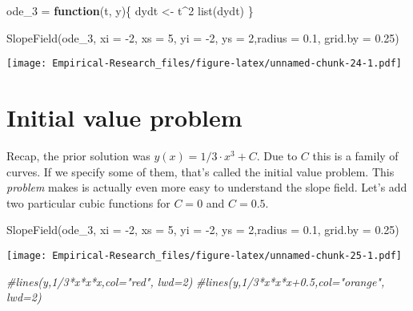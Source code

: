 \documentclass[
]{book}
\newenvironment{Shaded}{\begin{snugshade}}{\end{snugshade}}
\newcommand{\AttributeTok}[1]{\textcolor[rgb]{0.77,0.63,0.00}{#1}}
\newcommand{\CommentTok}[1]{\textcolor[rgb]{0.56,0.35,0.01}{\textit{#1}}}
\newcommand{\ControlFlowTok}[1]{\textcolor[rgb]{0.13,0.29,0.53}{\textbf{#1}}}
\newcommand{\DecValTok}[1]{\textcolor[rgb]{0.00,0.00,0.81}{#1}}
\newcommand{\FloatTok}[1]{\textcolor[rgb]{0.00,0.00,0.81}{#1}}
\newcommand{\FunctionTok}[1]{\textcolor[rgb]{0.00,0.00,0.00}{#1}}
\newcommand{\NormalTok}[1]{#1}
\newcommand{\OtherTok}[1]{\textcolor[rgb]{0.56,0.35,0.01}{#1}}
\newcommand{\SpecialCharTok}[1]{\textcolor[rgb]{0.00,0.00,0.00}{#1}}
\begin{document}
\begin{Shaded}
\begin{Highlighting}[]
\NormalTok{ode\_3 }\OtherTok{=} \ControlFlowTok{function}\NormalTok{(t, y)\{}
\NormalTok{  dydt }\OtherTok{\textless{}{-}}\NormalTok{ t}\SpecialCharTok{\^{}}\DecValTok{2}
  \FunctionTok{list}\NormalTok{(dydt)}
\NormalTok{\}}

\FunctionTok{SlopeField}\NormalTok{(ode\_3, }\AttributeTok{xi =} \SpecialCharTok{{-}}\DecValTok{2}\NormalTok{, }\AttributeTok{xs =} \DecValTok{5}\NormalTok{, }\AttributeTok{yi =} \SpecialCharTok{{-}}\DecValTok{2}\NormalTok{, }\AttributeTok{ys =} \DecValTok{2}\NormalTok{,}\AttributeTok{radius =} \FloatTok{0.1}\NormalTok{, }\AttributeTok{grid.by =} \FloatTok{0.25}\NormalTok{)}
\end{Highlighting}
\end{Shaded}

\texttt{[image: Empirical-Research\_files/figure-latex/unnamed-chunk-24-1.pdf]}

\hypertarget{initial-value-problem}{%
\section{Initial value problem}\label{initial-value-problem}}

Recap, the prior solution was \(y(x) = 1/3 \cdot x^3 + C\). Due to \(C\) this is a family of curves. If we specify some of them, that's called the initial value problem. This \emph{problem} makes is actually even more easy to understand the slope field. Let's add two particular cubic functions for \(C = 0\) and \(C = 0.5\).

\begin{Shaded}
\begin{Highlighting}[]
\FunctionTok{SlopeField}\NormalTok{(ode\_3, }\AttributeTok{xi =} \SpecialCharTok{{-}}\DecValTok{2}\NormalTok{, }\AttributeTok{xs =} \DecValTok{5}\NormalTok{, }\AttributeTok{yi =} \SpecialCharTok{{-}}\DecValTok{2}\NormalTok{, }\AttributeTok{ys =} \DecValTok{2}\NormalTok{,}\AttributeTok{radius =} \FloatTok{0.1}\NormalTok{, }\AttributeTok{grid.by =} \FloatTok{0.25}\NormalTok{)}
\end{Highlighting}
\end{Shaded}

\texttt{[image: Empirical-Research\_files/figure-latex/unnamed-chunk-25-1.pdf]}

\begin{Shaded}
\begin{Highlighting}[]
\CommentTok{\#lines(y,1/3*x*x*x,col="red", lwd=2)}
\CommentTok{\#lines(y,1/3*x*x*x+0.5,col="orange", lwd=2)}
\end{Highlighting}
\end{Shaded}
\end{document}
